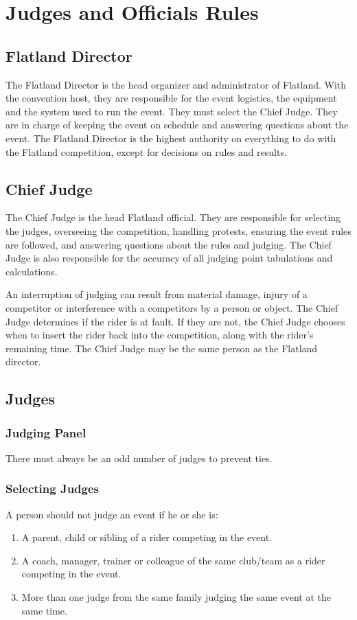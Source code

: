 \chapter{Judges and Officials Rules}

\section{Flatland Director}

The Flatland Director is the head organizer and administrator of Flatland.
With the convention host, they are responsible for the event logistics, the equipment and the system used to run the event.
They must select the Chief Judge.
They are in charge of keeping the event on schedule and answering questions about the event.
The Flatland Director is the highest authority on everything to do with the Flatland competition, except for decisions on rules and results.

\section{Chief Judge}

The Chief Judge is the head Flatland official.
They are responsible for selecting the judges, overseeing the competition, handling protests, ensuring the event rules are followed, and answering questions about the rules and judging.
The Chief Judge is also responsible for the accuracy of all judging point tabulations and calculations.

An interruption of judging can result from material damage, injury of a competitor or interference with a competitors by a person or object.
The Chief Judge determines if the rider is at fault.
If they are not, the Chief Judge chooses when to insert the rider back into the competition, along with the rider's remaining time.
The Chief Judge may be the same person as the Flatland director.

\section{Judges}

\subsection{Judging Panel}

There must always be an odd number of judges to prevent ties. 

\subsection{Selecting Judges}
A person should not judge an event if he or she is:
\begin{enumerate}
\item A parent, child or sibling of a rider competing in the event.
\item A coach, manager, trainer or colleague of the same club/team as a rider competing in the event. 
\item More than one judge from the same family judging the same event at the same time.
\end{enumerate}

